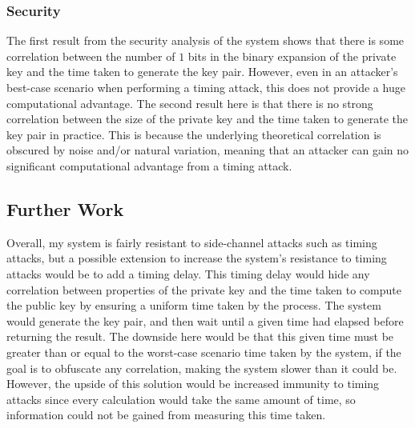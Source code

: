 \documentclass[12pt,a4paper]{article}
\begin{document}
\subsubsection{Security} \noindent
The first result from the security analysis of the system shows that there is some correlation between the number of $1$ bits in the binary expansion of the private key and the time taken to generate the key pair. 
However, even in an attacker's best-case scenario when performing a timing attack, 
this does not provide a huge computational advantage. 
The second result here is that there is no strong correlation between the size of the private key and the time taken to generate the key pair in practice. 
This is because the underlying theoretical correlation is obscured by noise and/or natural variation, 
meaning that an attacker can gain no significant computational advantage from a timing attack. 

\subsection{Further Work} \noindent
Overall, my system is fairly resistant to side-channel attacks such as timing attacks, 
but a possible extension to increase the system's resistance to timing attacks would be to add a timing delay. 
This timing delay would hide any correlation between properties of the private key and the time taken to compute the public key by ensuring a uniform time taken by the process. 
The system would generate the key pair, and then wait until a given time had elapsed before returning the result. 
The downside here would be that this given time must be greater than or equal to the worst-case scenario time taken by the system, if the goal is to obfuscate any correlation, making the system slower than it could be. 
However, the upside of this solution would be increased immunity to timing attacks since every calculation would take the same amount of time, so information could not be gained from measuring this time taken. 

\vfill


\end{document}
